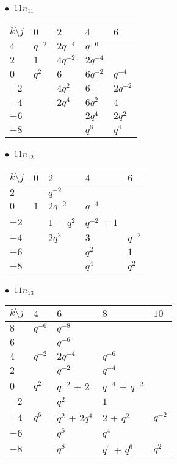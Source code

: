 \begin{minipage}{\linewidth}
$\bullet\ $ $11n_{11}$ \vspace{0.5em} \\
\begin{tabular}{l|llll}
$k \setminus j$ & $0$ & $2$ & $4$ & $6$ \\
\hline
$4$ & $q^{-2}$ & $2q^{-4}$ & $q^{-6}$ &  \\
$2$ & $1$ & $4q^{-2}$ & $2q^{-4}$ &  \\
$0$ & $q^{2}$ & $6$ & $6q^{-2}$ & $q^{-4}$ \\
$-2$ &  & $4q^{2}$ & $6$ & $2q^{-2}$ \\
$-4$ &  & $2q^{4}$ & $6q^{2}$ & $4$ \\
$-6$ &  &  & $2q^{4}$ & $2q^{2}$ \\
$-8$ &  &  & $q^{6}$ & $q^{4}$ \\
\end{tabular}
\vspace{2em}
\end{minipage}
%
\begin{minipage}{\linewidth}
$\bullet\ $ $11n_{12}$ \vspace{0.5em} \\
\begin{tabular}{l|llll}
$k \setminus j$ & $0$ & $2$ & $4$ & $6$ \\
\hline
$2$ &  & $q^{-2}$ &  &  \\
$0$ & $1$ & $2q^{-2}$ & $q^{-4}$ &  \\
$-2$ &  & $1$ + $q^{2}$ & $q^{-2}$ + $1$ &  \\
$-4$ &  & $2q^{2}$ & $3$ & $q^{-2}$ \\
$-6$ &  &  & $q^{2}$ & $1$ \\
$-8$ &  &  & $q^{4}$ & $q^{2}$ \\
\end{tabular}
\vspace{2em}
\end{minipage}
%
\begin{minipage}{\linewidth}
$\bullet\ $ $11n_{13}$ \vspace{0.5em} \\
\begin{tabular}{l|llll}
$k \setminus j$ & $4$ & $6$ & $8$ & $10$ \\
\hline
$8$ & $q^{-6}$ & $q^{-8}$ &  &  \\
$6$ &  & $q^{-6}$ &  &  \\
$4$ & $q^{-2}$ & $2q^{-4}$ & $q^{-6}$ &  \\
$2$ &  & $q^{-2}$ & $q^{-4}$ &  \\
$0$ & $q^{2}$ & $q^{-2}$ + $2$ & $q^{-4}$ + $q^{-2}$ &  \\
$-2$ &  & $q^{2}$ & $1$ &  \\
$-4$ & $q^{6}$ & $q^{2}$ + $2q^{4}$ & $2$ + $q^{2}$ & $q^{-2}$ \\
$-6$ &  & $q^{6}$ & $q^{4}$ &  \\
$-8$ &  & $q^{8}$ & $q^{4}$ + $q^{6}$ & $q^{2}$ \\
\end{tabular}
\vspace{2em}
\end{minipage}
